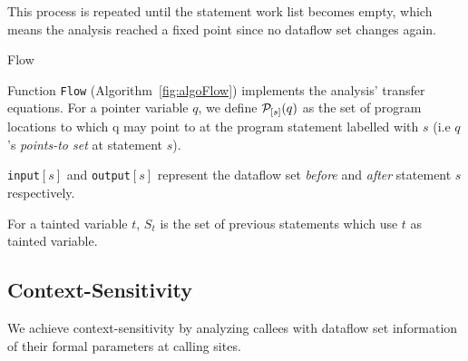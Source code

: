This process is repeated until the statement work list
becomes empty, which means the analysis reached a
fixed point since no dataflow set changes again.

\IncMargin{1em}
\begin{algorithm}
\caption{Flow}\label{fig:algoFlow}
\SetAlgoLined
\LinesNumbered
\DontPrintSemicolon
{}


\end{algorithm}
\DecMargin{1em}

Function \texttt{Flow} (Algorithm~\ref{fig:algoFlow})
implements the analysis' transfer equations.
For a pointer variable $q$, we define $\mathcal{P}_{[s]}(q)$
as the set of program locations to which q may point
to at the program statement labelled with $s$
(i.e $q$'s \textit{points-to set} at statement $s$).

\texttt{input}$[s]$ and \texttt{output}$[s]$ represent
the dataflow set \textit{before} and \textit{after}
statement $s$ respectively. 

For a tainted variable $t$, $S_t$ is the set of previous
statements which use $t$ as tainted variable.

\subsection{Context-Sensitivity} 

We achieve context-sensitivity by analyzing callees
with dataflow set information of their formal parameters
at calling sites.

